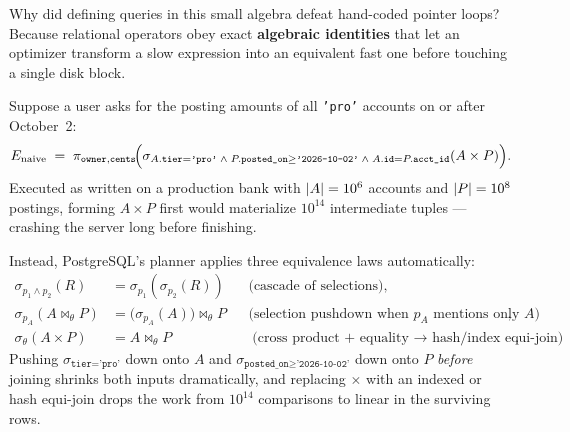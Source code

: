 Why did defining queries in this small algebra defeat hand-coded pointer loops? Because relational operators obey exact \textbf{algebraic identities} that let an optimizer transform a slow expression into an equivalent fast one before touching a single disk block.

Suppose a user asks for the posting amounts of all \texttt{'pro'} accounts on or after October~2:
\[
  E_{\text{naive}} \;=\; \pi_{\texttt{owner}, \texttt{cents}}\!\Bigl(\sigma_{A.\texttt{tier}=\texttt{'pro'} \;\land\; P.\texttt{posted\_on} \ge \texttt{'2026-10-02'}\;\land\; A.\texttt{id}=P.\texttt{acct\_id}}(A \times P)\Bigr).
\]
Executed as written on a production bank with $\lvert A\rvert = 10^6$ accounts and $\lvert P\rvert = 10^8$ postings, forming $A \times P$ first would materialize $10^{14}$ intermediate tuples --- crashing the server long before finishing.

Instead, PostgreSQL's planner applies three equivalence laws automatically:
\begin{align*}
  \sigma_{p_1 \land p_2}(R) &= \sigma_{p_1}(\sigma_{p_2}(R)) &&\text{(cascade of selections)}, \\
  \sigma_{p_A}(A \bowtie_\theta P) &= \bigl(\sigma_{p_A}(A)\bigr) \bowtie_\theta P &&\text{(selection pushdown when $p_A$ mentions only $A$)}, \\
  \sigma_{\theta}(A \times P) &= A \bowtie_{\theta} P &&\text{(cross product + equality $\to$ hash/index equi-join)}.
\end{align*}
Pushing $\sigma_{\texttt{tier='pro'}}$ down onto $A$ and $\sigma_{\texttt{posted\_on}\ge\texttt{'2026-10-02'}}$ down onto $P$ \emph{before} joining shrinks both inputs dramatically, and replacing $\times$ with an indexed or hash equi-join drops the work from $10^{14}$ comparisons to linear in the surviving rows.

